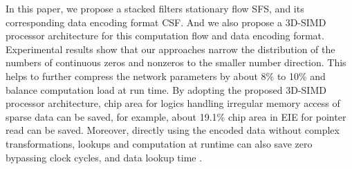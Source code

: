 \documentclass{article} %
\begin{document}
In this paper, we propose a stacked filters stationary flow SFS, and its corresponding data encoding format CSF. And we also propose a 3D-SIMD processor architecture for this computation flow and data encoding format. Experimental results show that our approaches narrow the distribution of the numbers of continuous zeros and nonzeros to the smaller number direction. This helps to further compress the network parameters by about 8\% to 10\% and balance computation load at run time. By adopting the proposed 3D-SIMD processor architecture, chip area for logics handling irregular memory access of sparse data can be saved, for example, about 19.1\% chip area in EIE \citep{han2016eie} for pointer read can be saved. Moreover, directly using the encoded data without complex transformations, lookups and computation at runtime can also save zero bypassing clock cycles, and data lookup time \citep{Moons2015DVAS, Moons201714, han2016eie}.



\end{document}
